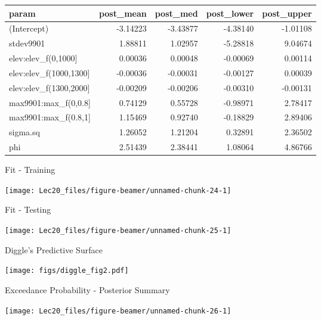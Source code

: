\documentclass[11pt,ignorenonframetext,]{beamer}
\begin{document}
\begin{frame}{}
\protect\hypertarget{section-1}{}

\footnotesize

\begin{longtable}[]{@{}lrrrr@{}}
\toprule
param & post\_mean & post\_med & post\_lower &
post\_upper\tabularnewline
\midrule
\endhead
(Intercept) & -3.14223 & -3.43877 & -4.38140 & -1.01108\tabularnewline
stdev9901 & 1.88811 & 1.02957 & -5.28818 & 9.04674\tabularnewline
elev:elev\_f(0,1000{]} & 0.00036 & 0.00048 & -0.00069 &
0.00114\tabularnewline
elev:elev\_f(1000,1300{]} & -0.00036 & -0.00031 & -0.00127 &
0.00039\tabularnewline
elev:elev\_f(1300,2000{]} & -0.00209 & -0.00206 & -0.00310 &
-0.00131\tabularnewline
max9901:max\_f(0,0.8{]} & 0.74129 & 0.55728 & -0.98971 &
2.78417\tabularnewline
max9901:max\_f(0.8,1{]} & 1.15469 & 0.92740 & -0.18829 &
2.89406\tabularnewline
sigma.sq & 1.26052 & 1.21204 & 0.32891 & 2.36502\tabularnewline
phi & 2.51439 & 2.38441 & 1.08064 & 4.86766\tabularnewline
\bottomrule
\end{longtable}

\end{frame}

\begin{frame}{Fit - Training}
\protect\hypertarget{fit---training-1}{}

\begin{center}\texttt{[image: Lec20\_files/figure-beamer/unnamed-chunk-24-1]} \end{center}

\end{frame}

\begin{frame}{Fit - Testing}
\protect\hypertarget{fit---testing-1}{}

\begin{center}\texttt{[image: Lec20\_files/figure-beamer/unnamed-chunk-25-1]} \end{center}

\end{frame}

\begin{frame}{Diggle's Predictive Surface}
\protect\hypertarget{diggles-predictive-surface}{}

\begin{center}
\texttt{[image: figs/diggle\_fig2.pdf]}
\end{center}

\end{frame}

\begin{frame}{Exceedance Probability - Posterior Summary}
\protect\hypertarget{exceedance-probability---posterior-summary}{}

\begin{center}\texttt{[image: Lec20\_files/figure-beamer/unnamed-chunk-26-1]} \end{center}

\end{frame}
\end{document}
